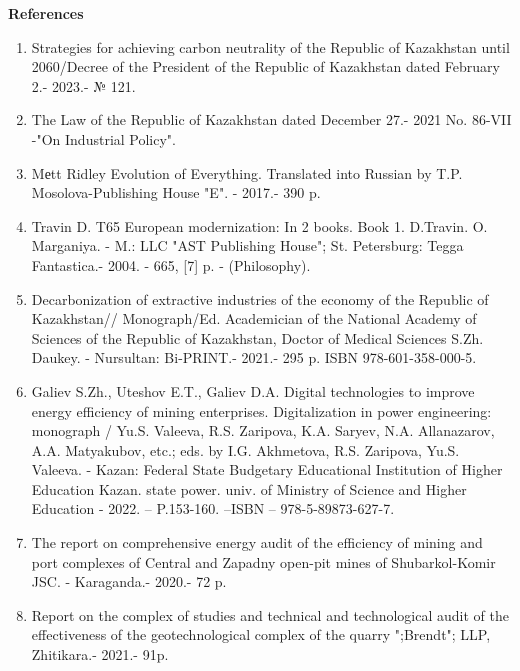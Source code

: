 \begin{center}
{\bfseries References}
\end{center}

\begin{enumerate}
\item
Strategies for achieving carbon neutrality of the Republic of
Kazakhstan until 2060/Decree of the President of the Republic of
Kazakhstan dated February 2.- 2023.- № 121.

\item
The Law of the Republic of Kazakhstan dated December 27.- 2021 No.
86-VII -"On Industrial Policy".

\item
Mеtt Ridley Evolution of Everything. Translated into Russian by T.P.
Mosolova-Publishing House "E". - 2017.- 390 p.

\item
Travin D. T65 European modernization: In 2 books. Book 1. D.Travin.
O. Marganiya. - M.: LLC "AST Publishing House"; St. Petersburg: Tegga
Fantastica.- 2004. - 665, {[}7{]} p. - (Philosophy).

\item
Decarbonization of extractive industries of the economy of the
Republic of Kazakhstan// Monograph/Ed. Academician of the National
Academy of Sciences of the Republic of Kazakhstan, Doctor of Medical
Sciences S.Zh. Daukey. - Nursultan: Bi-PRINT.- 2021.- 295 p. ISBN
978-601-358-000-5.

\item
Galiev S.Zh., Uteshov E.T., Galiev D.A. Digital technologies to improve energy efficiency of
mining enterprises. Digitalization in power engineering: monograph / Yu.S. Valeeva, R.S.
Zaripova, K.A. Saryev, N.A. Allanazarov, A.A. Matyakubov, etc.; eds. by I.G. Akhmetova, R.S.
Zaripova, Yu.S. Valeeva. - Kazan: Federal State Budgetary Educational Institution of Higher
Education Kazan. state power. univ. of Ministry of Science and Higher Education - 2022. –
P.153-160. –ISBN – 978-5-89873-627-7.

\item
The report on comprehensive energy audit of the efficiency of mining and port complexes of
Central and Zapadny open-pit mines of Shubarkol-Komir JSC. - Karaganda.- 2020.- 72 p.

\item
Report on the complex of studies and technical and technological audit of the effectiveness of
the geotechnological complex of the quarry ";Brendt"; LLP, Zhitikara.- 2021.- 91p.


\end{enumerate}
